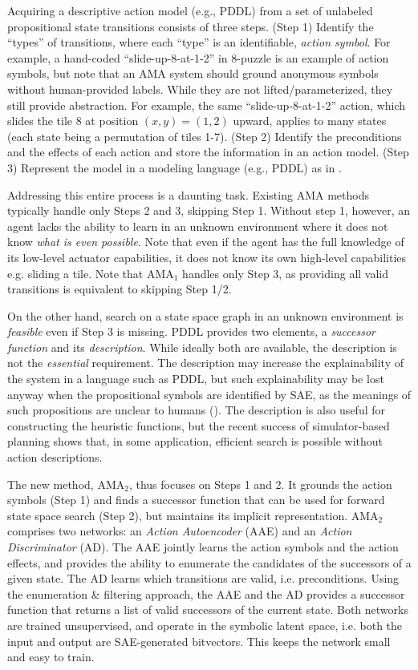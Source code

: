 \documentclass[11pt]{article}
\begin{document}
Acquiring a descriptive action model (e.g., PDDL) from a set of unlabeled propositional state transitions consists of three steps.
% 
(Step 1) Identify the ``types'' of transitions, where each ``type'' is an identifiable, \emph{action symbol}.
For example, a  hand-coded ``slide-up-8-at-1-2'' in 8-puzzle is an example of action symbols, but note that an AMA system should ground anonymous symbols without human-provided labels.
% 
While they are not lifted/parameterized, they still provide abstraction. For example, the same ``slide-up-8-at-1-2'' action, which slides the tile 8 at position $(x,y)=(1,2)$ upward, applies to many states (each state being a permutation of tiles 1-7).
% 
(Step 2) Identify the preconditions and the effects of each action and store the information in an action model.
(Step 3) Represent the model in a modeling language (e.g., PDDL) as in .

Addressing this entire process is a daunting task. 
Existing AMA methods typically handle only Steps 2 and 3, skipping Step 1.
Without step 1, however, an agent lacks the ability to learn in an unknown environment where it does not know \emph{what is even possible}.
Note that even if the agent has the full knowledge of its low-level actuator capabilities, it does not know its own high-level capabilities e.g. sliding a tile.
Note that AMA$_1$ handles only Step 3, as providing all valid transitions is equivalent to skipping Step 1/2.

On the other hand, search on a state space graph in an unknown environment is \textit{feasible} even if Step 3 is missing.
PDDL provides two elements, a \emph{successor function} and its \emph{description}.
While ideally both are available, the description is not the \emph{essential} requirement.
The description may increase the explainability of the system in a language such as PDDL,
but such explainability may be lost anyway when the propositional symbols are identified by SAE, as the meanings of such propositions are unclear to humans ().
The description is also useful for constructing the heuristic functions, but
the recent success of simulator-based planning \cite{frances2017purely}
shows that, in some application, efficient search is possible without action descriptions.
 
The new method, AMA$_2$, thus focuses on Steps 1 and 2.
It grounds the action symbols (Step 1) and finds a successor function that can be used for forward state space search (Step 2), but maintains its implicit representation.
% 
AMA$_2$ comprises two networks: an \emph{Action Autoencoder} (AAE) and an \emph{Action Discriminator} (AD). The AAE jointly learns the action symbols and the action effects, and provides the ability to enumerate the candidates of the successors of a given state. The AD learns which transitions are valid, i.e. preconditions. Using the enumeration \& filtering approach, the AAE and the AD provides a successor function that returns a list of valid successors of the current state. Both networks are trained unsupervised, and operate in the symbolic latent space, i.e. both the input and output are SAE-generated bitvectors. This keeps the network small and easy to train.
\end{document}
